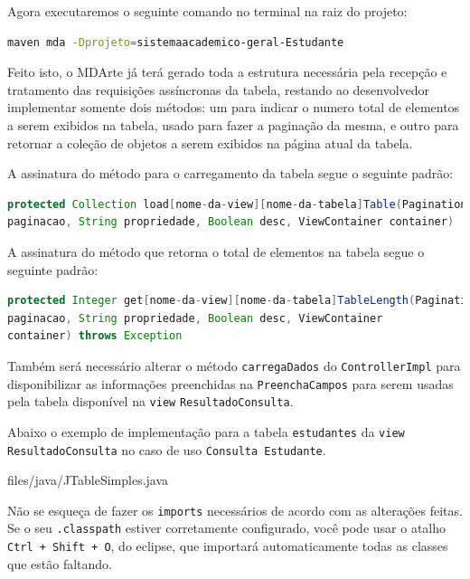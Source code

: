 Agora executaremos o seguinte comando no terminal na raiz do projeto:

\begin{lstlisting}[language=bash, frame=single, breaklines=true]
maven mda -Dprojeto=sistemaacademico-geral-Estudante
\end{lstlisting}

Feito isto, o MDArte já terá gerado toda a estrutura necessária pela recepção e
tratamento das requisições assíncronas da tabela, restando ao desenvolvedor
implementar somente dois métodos: um para indicar o numero total de elementos a
serem exibidos na tabela, usado para fazer a paginação da mesma, e outro para
retornar a coleção de objetos a serem exibidos na página atual da tabela.

A assinatura do método para o carregamento da tabela segue o seguinte padrão:

\begin{lstlisting}[language=java, frame=single, breaklines=true]
protected Collection load[nome-da-view][nome-da-tabela]Table(PaginationStrategy
paginacao, String propriedade, Boolean desc, ViewContainer container)
\end{lstlisting}

A assinatura do método que retorna o total de elementos na tabela segue o
seguinte padrão:

\begin{lstlisting}[language=java, frame=single, breaklines=true]
protected Integer get[nome-da-view][nome-da-tabela]TableLength(PaginationStrategy
paginacao, String propriedade, Boolean desc, ViewContainer
container) throws Exception
\end{lstlisting}

Também será necessário alterar o método \texttt{carregaDados} do
\texttt{ControllerImpl} para disponibilizar as informações preenchidas na
\texttt{PreenchaCampos} para serem usadas pela tabela disponível na
\texttt{view} \texttt{ResultadoConsulta}.

Abaixo o exemplo de implementação para a tabela \texttt{estudantes} da
\texttt{view ResultadoConsulta} no caso de uso \texttt{Consulta Estudante}.

 {files/java/JTableSimples.java}

Não se esqueça de fazer os \texttt{imports} necessários de acordo com as
alterações feitas. Se o seu \texttt{.classpath} estiver corretamente
configurado, você pode usar o atalho \texttt{Ctrl + Shift + O}, do eclipse, que
importará automaticamente todas as classes que estão faltando.

